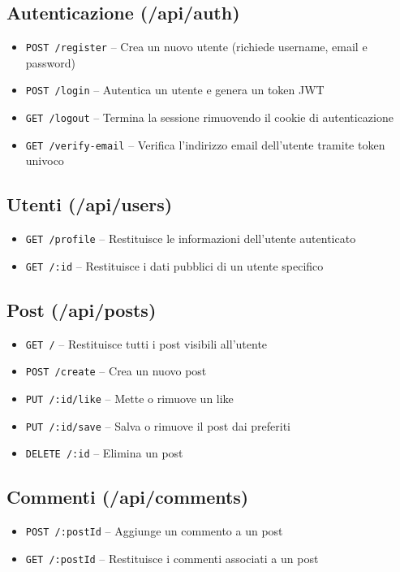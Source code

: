 \documentclass[a4paper,12pt]{article}
\begin{document}
\subsection{Autenticazione (/api/auth)}
\begin{itemize}
    \item \texttt{POST /register} – Crea un nuovo utente (richiede username, email e password)
    \item \texttt{POST /login} – Autentica un utente e genera un token JWT
    \item \texttt{GET /logout} – Termina la sessione rimuovendo il cookie di autenticazione
    \item \texttt{GET /verify-email} – Verifica l’indirizzo email dell’utente tramite token univoco
\end{itemize}

\subsection{Utenti (/api/users)}
\begin{itemize}
    \item \texttt{GET /profile} – Restituisce le informazioni dell’utente autenticato
    \item \texttt{GET /:id} – Restituisce i dati pubblici di un utente specifico
\end{itemize}

\subsection{Post (/api/posts)}
\begin{itemize}
    \item \texttt{GET /} – Restituisce tutti i post visibili all’utente
    \item \texttt{POST /create} – Crea un nuovo post
    \item \texttt{PUT /:id/like} – Mette o rimuove un like
    \item \texttt{PUT /:id/save} – Salva o rimuove il post dai preferiti
    \item \texttt{DELETE /:id} – Elimina un post
\end{itemize}

\subsection{Commenti (/api/comments)}
\begin{itemize}
    \item \texttt{POST /:postId} – Aggiunge un commento a un post
    \item \texttt{GET /:postId} – Restituisce i commenti associati a un post
\end{itemize}
\end{document}
